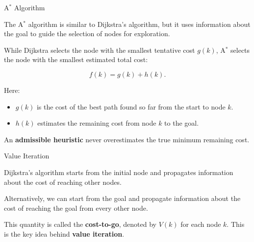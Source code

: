 \documentclass{beamer}
\begin{document}
\begin{frame}{A$^\ast$ Algorithm}
	\begin{flushleft}
		
		The A$^\ast$ algorithm is similar to Dijkstra's
		algorithm, but it uses information about the goal
		to guide the selection of nodes for exploration.
		
		\medskip
		While Dijkstra selects the node with the smallest
		tentative cost $g(k)$, A$^\ast$ selects the node
		with the smallest estimated total cost:
		
		\[
		f(k)=g(k)+h(k).
		\]
		
		Here:
		\begin{itemize}
			\item $g(k)$ is the cost of the best path
			found so far from the start to node $k$.
			\item $h(k)$ estimates the remaining cost
			from node $k$ to the goal.
		\end{itemize}
		
		An \textbf{admissible heuristic} never overestimates
		the true minimum remaining cost.
		
	\end{flushleft}
\end{frame}




\begin{frame}{Value Iteration}
	\begin{flushleft}
		
		Dijkstra's algorithm starts from the initial node
		and propagates information about the cost of
		reaching other nodes.
		
		
		\medskip
		
		Alternatively, we can start from the goal and
		propagate information about the cost of reaching
		the goal from every other node.
		
		\bigskip
		This quantity is called the \textbf{cost-to-go},
		denoted by $V(k)$ for each node $k$. This is the key idea behind \textbf{value iteration}.
		
	\end{flushleft}
\end{frame}
\end{document}
